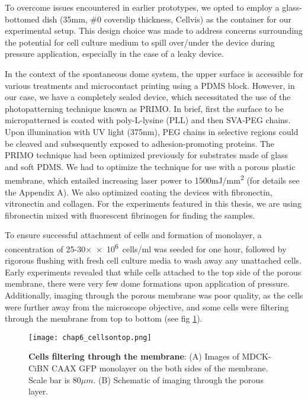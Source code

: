 To overcome issues encountered in earlier prototypes, we opted to employ a glass-bottomed dish (35\unit{\mm}, \#0 coverslip thickness, Cellvis) as the container for our experimental setup. This design choice was made to address concerns surrounding the potential for cell culture medium to spill over/under the device during pressure application, especially in the case of a leaky device. 

In the context of the spontaneous dome system, the upper surface is accessible for various treatments and microcontact printing using a PDMS block. However, in our case, we have a completely sealed device, which necessitated the use of the photopatterning technique known as PRIMO. In brief, first the surface to be micropatterned is coated with poly-L-lysine (PLL) and then SVA-PEG chains. Upon illumination with UV light (375\unit{\nm}), PEG chains in selective regions could be cleaved and subsequently exposed to adhesion-promoting proteins. The PRIMO technique had been optimized previously for substrates made of glass and soft PDMS. We had to optimize the technique for use with a porous plastic membrane, which entailed increasing laser power to 1500\unit{mJ/\mm^2} (for details see the Appendix A). We also optimized coating the devices with fibronectin, vitronectin and collagen. For the experiments featured in this thesis, we are using fibronectin mixed with fluorescent fibrinogen for finding the samples.

To ensure successful attachment of cells and formation of monolayer, a concentration of 25-30×\unit{\num{e6} cells/\ml} was seeded for one hour, followed by rigorous flushing with fresh cell culture media to wash away any unattached cells. Early experiments revealed that while cells attached to the top side of the porous membrane, there were very few dome formations upon application of pressure. Additionally, imaging through the porous membrane was poor quality, as the cells were further away from the microscope objective, and some cells were filtering through the membrane from top to bottom (see fig \ref{fig_6_4}).  

\begin{figure}[h!]
	\centering
	\texttt{[image: chap6\_cellsontop.png]}
	\caption{ \textbf{Cells filtering through the membrane}: (A) Images of MDCK-CiBN CAAX GFP monolayer on the both sides of the membrane. Scale bar is $80\mu m$. (B) Schematic of imaging through the porous layer.	}\label{fig_6_4}
\end{figure}

